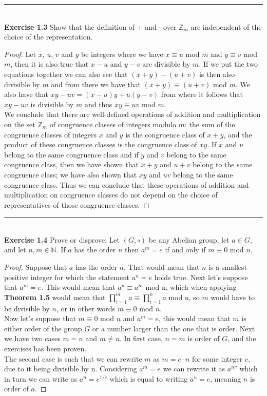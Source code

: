 \documentclass[a4paper]{article}
\begin{document}
\noindent\rule{12cm}{0.4pt}\\
\noindent \textbf{Exercise 1.3} Show that the definition of $+$ and $\cdot$ over $\mathbb{Z}_m$ are independent of the choice of the representation.
\begin{proof}
Let $x$, $u$, $v$ and $y$ be integers where we have $x \equiv u$ mod $m$ and $y \equiv v$ mod $m$, then it is also true that $x -u$ and $y - v$ are divisible by $m$. If we put the two equations together we can also see that $(x + y) - (u + v)$ is then also divisible by $m$ and from there we have that $(x+y) \equiv (u+v)$ mod $m$. We also have that $xy - uv = (x-u)y + u(y-v)$ from where it follows that $xy-uv$ is divisible by $m$ and thus $xy \equiv uv$ mod $m$.\\
We conclude that there are well-defined operations of addition and multiplication on the set $\mathbb{Z}_{m}$ of congruence classes of integers modulo $m$: the sum of the congruence classes of integers $x$ and $y$ is the congruence class of $x+y$, and the product of these congruence classes is the congruence class of $xy$. If $x$ and $u$ belong to the same congruence class and if $y$ and $v$ belong to the same congruence class, then we have shown that $x+y$ and $u+v$ belong to the same congruence class; we have also shown that $xy$ and $uv$ belong to the same congruence class. Thus we can conclude that these operations of addition and multiplication on congruence classes do not depend on the choice of representatives of those congruence classes.
\end{proof}



\noindent\rule{12cm}{0.4pt}\\
\noindent \textbf{Exercise 1.4} Prove or disprove: Let $(G, \circ)$ be any Abelian group, let $a \in G$, and let $n, m \in \mathbb{N}$. If $a$ has the order $n$ then $a^m=e$ if and only if $m \equiv 0$ mod $n$.
\begin{proof}
Suppose that $a$ has the order $n$. That would mean that $n$ is a smallest positive integer for which the statement $a^n=e$ holds true. Next let's suppose that $a^m=e$. This would mean that $a^n \equiv a^m$ mod n, which when applying \textbf{Theorem 1.5} would mean that $\prod_{i=1}^{m} a \equiv \prod_{i=1}^{n} a$ mod n, so $m$ would have to be divisible by $n$, or in other words $m \equiv 0$ mod $n$.\\
Now let's suppose that $m \equiv 0$ mod $n$ and $a^m=e$, this would mean that $m$ is either order of the group $G$ or a number larger than the one that is order. Next we have two cases $m=n$ and $m \neq n$. In first case, $n=m$ is order of $G$, and the exercises has been proven.\\
The second case is such that we can rewrite $m$ as $m=c\cdot n$ for some integer $c$, due to it being divisible by n. Considering $a^m=e$ we can rewrite it as ${a^n}^c$ which in turn we can write as $a^n=e^{1/c}$ which is equal to writing $a^n=e$, meaning $n$ is order of $a$.
\end{proof}
\end{document}
